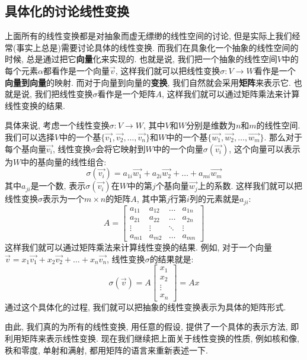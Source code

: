 \documentclass{ctexart}
\begin{document}
\subsection{具体化的讨论线性变换}

上面所有的线性变换都是对抽象而虚无缥缈的线性空间的讨论, 但是实际上我们经常(事实上总是)需要讨论具体的线性变换. 而我们在具象化一个抽象的线性空间的时候, 总是通过把它\textbf{向量}化来实现的. 也就是说, 我们把一个抽象的线性空间$V$中的每个元素$\alpha$都看作是一个向量$\vec{v}$, 这样我们就可以把线性变换$\sigma: V \to W$看作是一个\textbf{向量到向量}的映射. 而对于向量到向量的\textbf{变换}, 我们自然就会采用\textbf{矩阵}来表示它. 也就是说, 我们把线性变换$\sigma$看作是一个矩阵$A$, 这样我们就可以通过矩阵乘法来计算线性变换的结果.

具体来说, 考虑一个线性变换$\sigma: V \to W$, 其中$V$和$W$分别是维数为$n$和$m$的线性空间. 我们可以选择$V$中的一个基$\{\vec{v_1}, \vec{v_2}, \ldots, \vec{v_n}\}$和$W$中的一个基$\{\vec{w_1}, \vec{w_2}, \ldots, \vec{w_m}\}$. 那么对于每个基向量$\vec{v_i}$, 线性变换$\sigma$会将它映射到$W$中的一个向量$\sigma(\vec{v_i})$, 这个向量可以表示为$W$中的基向量的线性组合:
$$\sigma(\vec{v_i}) = a_{1i}\vec{w_1} + a_{2i}\vec{w_2} + \ldots + a_{mi}\vec{w_m}$$
其中$a_{ji}$是一个数, 表示$\sigma(\vec{v_i})$在$W$中的第$j$个基向量$\vec{w_j}$上的系数. 这样我们就可以把线性变换$\sigma$表示为一个$m \times n$的矩阵$A$, 其中第$j$行第$i$列的元素就是$a_{ji}$:
$$A = \begin{bmatrix}a_{11} & a_{12} & \ldots & a_{1n} \\a_{21} & a_{22} & \ldots & a_{2n} \\\vdots & \vdots & \ddots & \vdots \\a_{m1} & a_{m2} & \ldots & a_{mn}\end{bmatrix}$$
这样我们就可以通过矩阵乘法来计算线性变换的结果. 例如, 对于一个向量$\vec{v} = x_1\vec{v_1} + x_2\vec{v_2} + \ldots + x_n\vec{v_n}$, 线性变换$\sigma$的结果就是:
$$\sigma(\vec{v}) = A \begin{bmatrix}x_1 \\x_2 \\\vdots \\x_n\end{bmatrix}=Ax$$
通过这个具体化的过程, 我们就可以把抽象的线性变换表示为具体的矩阵形式.

由此, 我们真的为所有的线性变换, 用任意的假设, 提供了一个具体的表示方法, 即利用矩阵来表示线性变换. 现在我们继续把上面关于线性变换的性质, 例如核和像, 秩和零度, 单射和满射, 都用矩阵的语言来重新表述一下.
\end{document}
